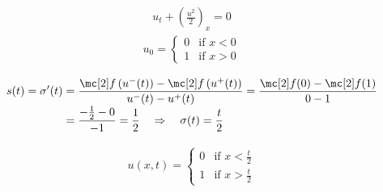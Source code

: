 \begin{examplebox}\nospacing
    \begin{example}\label{example:rk_for_riemann_problem_rarefaction}
        \begin{minipage}{0.4\textwidth}
            \begin{align}
            u_{t}+\left(\frac{u^{2}}{2}\right)_{x}=0
            \end{align}
            \begin{align}
            u_{0}=\begin{cases}
                    0&\text{if }x<0\\
                    1&\text{if }x>0
                    \end{cases}
            \label{eq:riemann_problem}
            \end{align}
        \end{minipage}\hfil
        \begin{minipage}[c]{0.4\textwidth}
            \begin{figure}[H]
                \centering{
                  \def\svgwidth{100pt}
                  \resizebox{\linewidth}{!}{}
                }
            \end{figure}
        \end{minipage}
        \begin{align*}
          s(t)=\sigma'(t)&=\frac{\flux \left(u^{-}(t)\right)-\flux \left(u^{+}(t)\right)}{
          u^{-}(t)-u^{+}(t)
          }=\frac{\flux(0)-\flux(1)}{0-1}\\[-1\jot]
          &=\frac{-\frac{1}{2}-0}{-1}=\frac{1}{2}\quad\Rightarrow\quad\sigma(t)=\frac{t}{2}
        \end{align*}
        \begin{minipage}[c]{0.55\textwidth}
            \begin{align}
            u(x,t)=\begin{cases}
                    0&\text{if }x<\frac{t}{2}\\
                    1&\text{if }x>\frac{t}{2}
                    \end{cases}
            \label{eq:riemann_problem}
            \end{align}
        \end{minipage}
        \vspace{-1em}
        \begin{minipage}{0.3\textwidth}

\end{minipage}
\end{example}
\end{examplebox}
